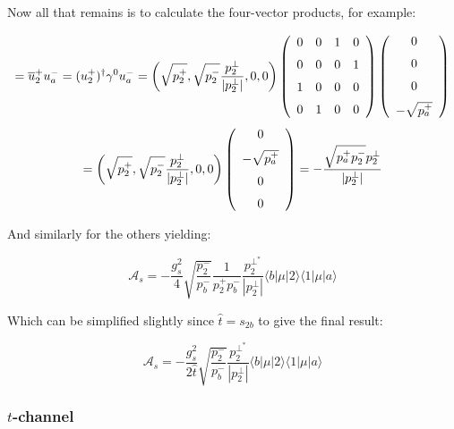 			Now all that remains is to calculate the four-vector products, for example:

			\begin{equation}
			[2a]=\overline{u}^+_2u^-_a=(u^+_2)^\dagger\gamma^0u^-_a=\left(\sqrt{p^+_2}, \sqrt{p^-_2}\frac{p^{\perp}_2}{|p_2^\perp|}, 0, 0\right) \left(\begin {array}{cccc} 0&0&1&0\\ \noalign{\medskip}0&0&0&1
			\\ \noalign{\medskip}1&0&0&0\\ \noalign{\medskip}0&1&0&0\end {array}\right)\left( \begin {array}{c} 0\\ \noalign{\medskip}0\\ \noalign{\medskip}0\\ \noalign{\medskip}-\sqrt{p^+_a}\end {array}\right)
			\end{equation}
			\begin{equation}
			[2a]=\left(\sqrt{p^+_2}, \sqrt{p^-_2}\frac{p^{\perp}_2}{|p_2^\perp|}, 0, 0\right)\left( \begin {array}{c} 0\\ \noalign{\medskip}-\sqrt{p^+_a}\\
			\noalign{\medskip}0\\ \noalign{\medskip}0\end {array}\right)=-\frac{\sqrt{p_a^+p_2^-}p_2^\perp}{|p_2^\perp|}
			\end{equation}

			And similarly for the others yielding:

			\begin{equation}
			\mathcal{A}_s=-\frac{g_s^2}{4}\sqrt{\frac{p_2^-}{p_b^-}}\frac{1}{p_2^+p_b^-}\frac{p_2^{\perp^*}}{|p_2^\perp|}\langle{b}|\mu|2\rangle\langle{1}|\mu|a\rangle
			\end{equation}

			Which can be simplified slightly since $\hat{t}=s_{2b}$ to give the final result:

			\begin{equation}
			\mathcal{A}_s=-\frac{g_s^2}{2\hat{t}}\sqrt{\frac{p_2^-}{p_b^-}}\frac{p_2^{\perp^*}}{|p_2^\perp|}\langle{b}|\mu|2\rangle\langle{1}|\mu|a\rangle
			\end{equation}

		\subsubsection{$t$-channel}

